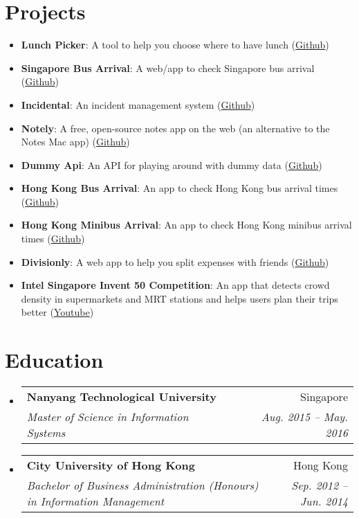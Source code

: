 \documentclass[letterpaper,11pt]{article}
\makeatletter
\newcommand{\resumeItem}[2]{
  \item\small{
    \textbf{#1}{: #2 \vspace{-2pt}}
  }
}
\newcommand{\resumeSubheading}[4]{
  \vspace{-1pt}\item
    \begin{tabular*}{0.97\textwidth}[t]{l@{\extracolsep{\fill}}r}
      \textbf{#1} & #2 \\
      \textit{\small#3} & \textit{\small #4} \\
    \end{tabular*}\vspace{-5pt}
}
\newcommand{\resumeSubItem}[2]{\resumeItem{#1}{#2}\vspace{-4pt}}
\newcommand{\resumeSubHeadingListStart}{\begin{itemize}[leftmargin=*]}
\newcommand{\resumeSubHeadingListEnd}{\end{itemize}}
\makeatother
\begin{document}
\section{Projects}
  \resumeSubHeadingListStart
    \resumeSubItem{Lunch Picker}
      {A tool to help you choose where to have lunch (\href{https://github.com/yeukfei02?tab=repositories&q=lunch&type=source&language=&sort=stargazers}{Github})}
    \resumeSubItem{Singapore Bus Arrival}
      {A web/app to check Singapore bus arrival (\href{https://github.com/yeukfei02?tab=repositories&q=singapore-bus&type=source&language=&sort=stargazers}{Github})}
    \resumeSubItem{Incidental}
      {An incident management system (\href{https://github.com/yeukfei02?tab=repositories&q=incident&type=source&language=&sort=stargazers}{Github})}
    \resumeSubItem{Notely}
      {A free, open-source notes app on the web (an alternative to the Notes Mac app) (\href{https://github.com/yeukfei02?tab=repositories&q=notely&type=source&language=&sort=stargazers}{Github})}
    \resumeSubItem{Dummy Api}
      {An API for playing around with dummy data (\href{https://github.com/yeukfei02?tab=repositories&q=dummy&type=source&language=&sort=stargazers}{Github})}
    \resumeSubItem{Hong Kong Bus Arrival}
      {An app to check Hong Kong bus arrival times (\href{https://github.com/yeukfei02?tab=repositories&q=hong+kong+bus&type=source&language=&sort=stargazers}{Github})}
    \resumeSubItem{Hong Kong Minibus Arrival}
      {An app to check Hong Kong minibus arrival times (\href{https://github.com/yeukfei02?tab=repositories&q=hong+kong+minibus&type=source&language=&sort=stargazers}{Github})}
    \resumeSubItem{Divisionly}
      {A web app to help you split expenses with friends (\href{https://github.com/yeukfei02?tab=repositories&q=division&type=source&language=&sort=stargazers}{Github})}
    \resumeSubItem{Intel Singapore Invent 50 Competition}
      {An app that detects crowd density in supermarkets and MRT stations and helps users plan their trips better (\href{https://www.youtube.com/watch?v=0AEbxRXz-tM&ab_channel=HardwareZoneSG}{Youtube})}
  \resumeSubHeadingListEnd


\section{Education}
  \resumeSubHeadingListStart
    \resumeSubheading
      {Nanyang Technological University}{Singapore}
      {Master of Science in Information Systems}{Aug. 2015 -- May. 2016}
    \resumeSubheading
      {City University of Hong Kong}{Hong Kong}
      {Bachelor of Business Administration (Honours) in Information Management}{Sep. 2012 -- Jun. 2014}
  \resumeSubHeadingListEnd


\end{document}
